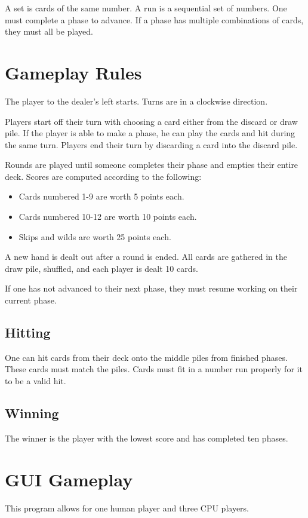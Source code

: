 \documentclass[12pt]{article}
\begin{document}
A set is cards of the same number. A run is a sequential set of numbers.
One must complete a phase to advance. If a phase has multiple combinations of cards, they
must all be played.

\section{Gameplay Rules}
The player to the dealer's left starts. Turns are in a clockwise direction.

Players start off their turn with choosing a card either from the discard or draw pile.
If the player is able to make a phase, he can play the cards and hit during the same
turn. Players end their turn by discarding a card into the discard pile.

Rounds are played until someone completes their phase and empties their entire deck.
Scores are computed according to the following:

\begin{itemize}
	\item Cards numbered 1-9 are worth 5 points each.
	\item Cards numbered 10-12 are worth 10 points each.
	\item Skips and wilds are worth 25 points each.
\end{itemize}

A new hand is dealt out after a round is ended. All cards are gathered in the draw pile,
shuffled, and each player is dealt 10 cards.

If one has not advanced to their next phase, they must resume working on their current
phase.

\subsection{Hitting}
One can hit cards from their deck onto the middle piles from finished phases. These cards
must match the piles. Cards must fit in a number run properly for it to be a valid hit.

\subsection{Winning}
The winner is the player with the lowest score and has completed ten phases.

\section{GUI Gameplay}
This program allows for one human player and three CPU players.
\end{document}
